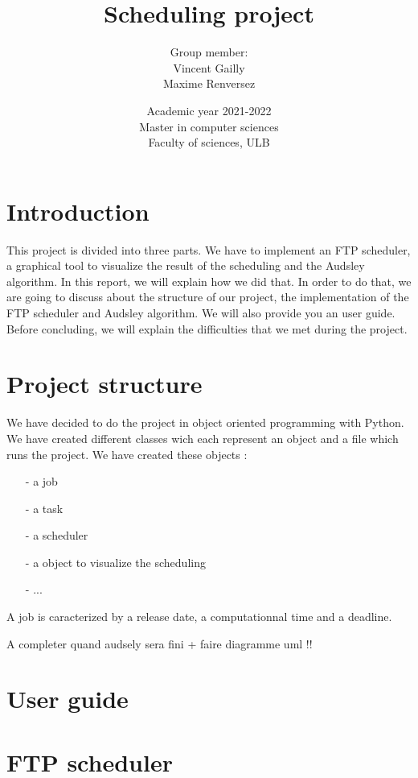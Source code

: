 \documentclass[a4paper,12pt]{article}
\title{
{\Huge Scheduling project}\\
\smallskip
}
\author{
Group member:\\
Vincent Gailly\\
Maxime Renversez
\smallskip
}
\date{ Academic year 2021-2022\\
Master in computer sciences \\
\vspace{1cm}
Faculty of sciences, ULB}
\begin{document}
\maketitle
\newpage
\tableofcontents
\newpage

\section{Introduction}

This project is divided into three parts. We have to implement an FTP scheduler, a graphical tool to visualize the result of the scheduling and the Audsley algorithm. In this report, we will explain how we did that. In order to do that, we are going to discuss about the structure of our project, the implementation of the FTP scheduler and Audsley algorithm. We will also provide you an user guide. Before concluding, we will explain the difficulties that we met during the project.      

\newpage

\section{Project structure}

We have decided to do the project in object oriented programming with Python. We have created different classes wich each represent an object and a file which runs the project. We have created these objects : \\
\begin{itemize}
\item[-] a job 
\item[-] a task 
\item[-] a scheduler 
\item[-] a object  to visualize the scheduling 
\item[-] ...
\end{itemize}

\smallskip
\noindent
A job is caracterized by a release date, a computationnal time and a deadline. 

\smallskip 
A completer quand audsely sera fini  + faire diagramme uml !! 

\newpage

\section{User guide}

\newpage

\section{FTP scheduler}
\end{document}
